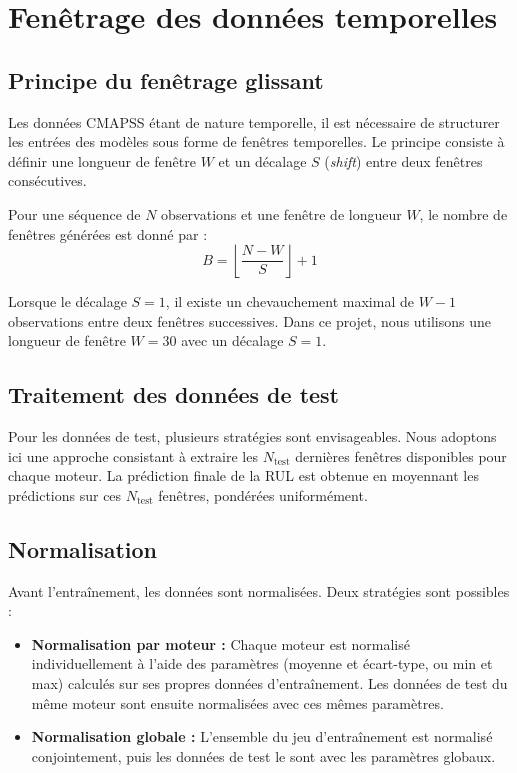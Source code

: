 \documentclass[12pt,a4paper]{report}
\theoremstyle{definition}
\begin{document}
\section{Fenêtrage des données temporelles}

\subsection{Principe du fenêtrage glissant}

Les données CMAPSS étant de nature temporelle, il est nécessaire de structurer les entrées des modèles sous forme de fenêtres temporelles. Le principe consiste à définir une longueur de fenêtre $W$ et un décalage $S$ (\emph{shift}) entre deux fenêtres consécutives.

Pour une séquence de $N$ observations et une fenêtre de longueur $W$, le nombre de fenêtres générées est donné par :
\begin{equation}
    B = \left\lfloor \frac{N - W}{S} \right\rfloor + 1
\end{equation}

Lorsque le décalage $S = 1$, il existe un chevauchement maximal de $W-1$ observations entre deux fenêtres successives. Dans ce projet, nous utilisons une longueur de fenêtre $W = 30$ avec un décalage $S = 1$.

\subsection{Traitement des données de test}

Pour les données de test, plusieurs stratégies sont envisageables. Nous adoptons ici une approche consistant à extraire les $N_{\text{test}}$ dernières fenêtres disponibles pour chaque moteur. La prédiction finale de la RUL est obtenue en moyennant les prédictions sur ces $N_{\text{test}}$ fenêtres, pondérées uniformément.

\subsection{Normalisation}

Avant l'entraînement, les données sont normalisées. Deux stratégies sont possibles :
\begin{itemize}
    \item \textbf{Normalisation par moteur :} Chaque moteur est normalisé individuellement à l'aide des paramètres (moyenne et écart-type, ou min et max) calculés sur ses propres données d'entraînement. Les données de test du même moteur sont ensuite normalisées avec ces mêmes paramètres.
    \item \textbf{Normalisation globale :} L'ensemble du jeu d'entraînement est normalisé conjointement, puis les données de test le sont avec les paramètres globaux.
\end{itemize}
\end{document}
